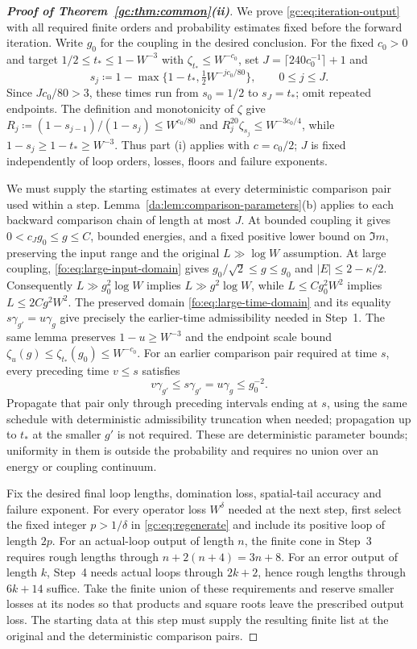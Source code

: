 \documentclass[11pt]{article}
\numberwithin{equation}{section}
\theoremstyle{remark}
\begin{document}
\begin{proof}[\textbf{Proof of Theorem~\ref{gc:thm:common}(ii)}]
We prove \eqref{gc:eq:iteration-output} with all
required finite orders and probability estimates fixed before the forward
iteration. Write $g_0$ for the coupling in the desired conclusion.
For the fixed $c_0>0$ and target $1/2\le t_*\le1-W^{-3}$ with
$\zeta_{t_*}\le W^{-c_0}$, set $J=\lceil240c_0^{-1}\rceil+1$ and
\begin{equation}\label{gc:eq:finite-schedule}
 s_j\coloneqq1-\max\{1-t_*,\tfrac12W^{-jc_0/80}\},\qquad 0\le j\le J.
\end{equation}
Since $Jc_0/80>3$, these times run from $s_0=1/2$ to $s_J=t_*$;
omit repeated endpoints. The definition and monotonicity of $\zeta$ give
$R_j\coloneqq(1-s_{j-1})/(1-s_j)\le W^{c_0/80}$ and
$R_j^{20}\zeta_{s_j}\le W^{-3c_0/4}$, while
$1-s_j\ge1-t_*\ge W^{-3}$. Thus part (i) applies with $c=c_0/2$;
$J$ is fixed independently of loop orders, losses, floors and failure exponents.

We must supply the starting estimates at every deterministic comparison
pair used within a step. Lemma~\ref{da:lem:comparison-parameters}(b)
applies to each backward comparison chain of length at most $J$.
At bounded coupling it gives $0<c_Jg_0\le g\le C$, bounded energies,
and a fixed positive lower bound on $\Im m$, preserving the input
range and the original $L\gg\log W$ assumption. At large coupling,
\eqref{fo:eq:large-input-domain} gives
$g_0/\sqrt2\le g\le g_0$ and $|E|\le2-\kappa/2$.
Consequently $L\gg g_0^2\log W$ implies $L\gg g^2\log W$, while
$L\le Cg_0^2W^2$ implies $L\le2Cg^2W^2$.
The preserved domain \eqref{fo:eq:large-time-domain} and its equality
$s\gamma_{g'}=u\gamma_g$ give precisely the earlier-time admissibility
needed in Step~1. The same lemma preserves $1-u\ge W^{-3}$ and the
endpoint scale bound $\zeta_u(g)\le\zeta_{t_*}(g_0)\le W^{-c_0}$.
For an earlier comparison pair required at time $s$, every preceding
time $v\le s$ satisfies
\[
 v\gamma_{g'}\le s\gamma_{g'}=u\gamma_g\le g_0^{-2}.
\]
Propagate that pair only through preceding intervals ending at $s$,
using the same schedule with deterministic admissibility truncation
when needed; propagation up to $t_*$ at the smaller $g'$ is not required.
These are deterministic parameter bounds; uniformity in them is outside
the probability and requires no union over an energy or coupling continuum.

Fix the desired final loop lengths, domination loss, spatial-tail
accuracy and failure exponent. For every operator loss $W^\delta$
needed at the next step, first select the fixed integer $p>1/\delta$
in \eqref{gc:eq:regenerate} and include its positive loop of length $2p$.
For an actual-loop output of length $n$, the finite cone in Step~3
requires rough lengths through $n+2(n+4)=3n+8$.
For an error output of length $k$, Step~4 needs actual loops through
$2k+2$, hence rough lengths through $6k+14$ suffice.
Take the finite union of these requirements and reserve smaller losses
at its nodes so that products and square roots leave the prescribed
output loss. The starting data at this step must supply the resulting
finite list at the original and the deterministic comparison pairs.


\end{proof}
\end{document}

